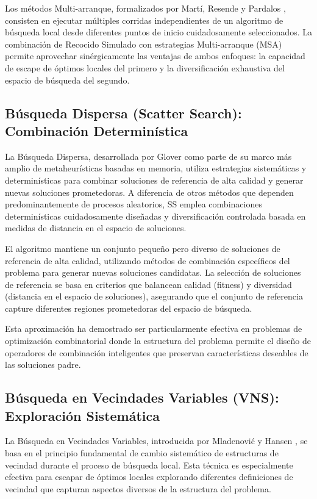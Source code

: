 Los métodos Multi-arranque, formalizados por Martí, Resende y Pardalos \cite{marti2018multistart}, consisten en ejecutar múltiples corridas independientes de un algoritmo de búsqueda local desde diferentes puntos de inicio cuidadosamente seleccionados. La combinación de Recocido Simulado con estrategias Multi-arranque (MSA) permite aprovechar sinérgicamente las ventajas de ambos enfoques: la capacidad de escape de óptimos locales del primero y la diversificación exhaustiva del espacio de búsqueda del segundo.

\subsection{Búsqueda Dispersa (Scatter Search): Combinación Determinística}

La Búsqueda Dispersa, desarrollada por Glover \cite{glover1998template} como parte de su marco más amplio de metaheurísticas basadas en memoria, utiliza estrategias sistemáticas y determinísticas para combinar soluciones de referencia de alta calidad y generar nuevas soluciones prometedoras. A diferencia de otros métodos que dependen predominantemente de procesos aleatorios, SS emplea combinaciones determinísticas cuidadosamente diseñadas y diversificación controlada basada en medidas de distancia en el espacio de soluciones.

El algoritmo mantiene un conjunto pequeño pero diverso de soluciones de referencia de alta calidad, utilizando métodos de combinación específicos del problema para generar nuevas soluciones candidatas. La selección de soluciones de referencia se basa en criterios que balancean calidad (fitness) y diversidad (distancia en el espacio de soluciones), asegurando que el conjunto de referencia capture diferentes regiones prometedoras del espacio de búsqueda.

Esta aproximación ha demostrado ser particularmente efectiva en problemas de optimización combinatorial donde la estructura del problema permite el diseño de operadores de combinación inteligentes que preservan características deseables de las soluciones padre.

\subsection{Búsqueda en Vecindades Variables (VNS): Exploración Sistemática}

La Búsqueda en Vecindades Variables, introducida por Mladenović y Hansen \cite{mladenovic1997variable}, se basa en el principio fundamental de cambio sistemático de estructuras de vecindad durante el proceso de búsqueda local. Esta técnica es especialmente efectiva para escapar de óptimos locales explorando diferentes definiciones de vecindad que capturan aspectos diversos de la estructura del problema.

